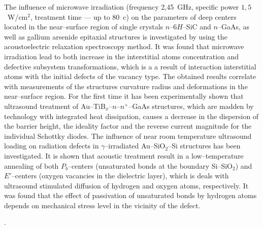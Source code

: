The influence of microwave irradiation (frequency 2,45~GHz, specific power $1,5$~W/cm$^2$, treatment time --- up to 80~c) on the parameters of deep centers located in the near--surface region of single crystals $n$--6$H$--SiC and $n$--GaAs, as well as gallium arsenide epitaxial structures is investigated by using the acoustoelectric relaxation spectroscopy method.
It was found that microwave irradiation lead to both increase in the interstitial atoms concentration and defective subsystem transformations, which is a a result of interaction interstitial atoms with the initial defects of the vacancy type.
The obtained results correlate with measurements of the structures curvature radius and deformations in the near--surface region.
For the first time it has been experimentally shown that ultrasound treatment of Au--TiB$_x$--$n$--$n^+$--GaAs structures, which  are
madden by technology with integrated heat dissipation, causes a decrease in the dispersion of the barrier height, the ideality factor and the reverse current magnitude for the individual Schottky diodes.
The influence of near room temperature ultrasound loading on radiation defects in $\gamma$--irradiated Au--SiO$_2$--Si structures has been investigated.
It is shown that acoustic treatment result in a low--temperature annealing of both $P_b$--centers (unsaturated bonds at the boundary Si--SiO$_2$) and
$E'$--centers (oxygen vacancies in the dielectric layer), which is deals with ultrasound stimulated diffusion of hydrogen and oxygen atoms, respectively.
It was found that the effect of passivation of unsaturated bonds by hydrogen atoms depends on mechanical stress level in the vicinity of the defect.


\vspace{0.7cm}
\noindent
\keywordsEn.

\vspace{2cm}



